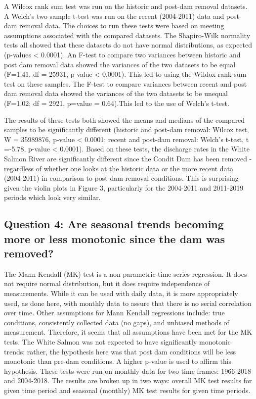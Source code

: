 \documentclass[
  12pt,
]{article}
\begin{document}
A Wilcox rank sum test was run on the historic and post-dam removal
datasets. A Welch's two sample t-test was run on the recent (2004-2011)
data and post-dam removal data. The choices to run these tests were
based on meeting assumptions associated with the compared datasets. The
Shapiro-Wilk normality tests all showed that these datasets do not have
normal distributions, as expected (p-values \textless{} 0.0001). An
F-test to compare two variances between historic and post dam removal
data showed the variances of the two datasets to be equal (F=1.41, df =
25931, p-value \textless{} 0.0001). This led to using the Wildox rank
sum test on these samples. The F-test to compare variances between
recent and post dam removal data showed the variances of the two
datasets to be unequal (F=1.02; df = 2921, p=value = 0.64).This led to
the use of Welch's t-test.

The results of these tests both showed the means and medians of the
compared samples to be significantly different (historic and post-dam
removal: Wilcox test, W = 35989876, p-value \textless{} 0.0001; recent
and post-dam removal: Welch's t-test, t =-5.78, p-value \textless{}
0.0001). Based on these tests, the discharge rates in the White Salmon
River are significantly different since the Condit Dam has been removed
- regardless of whether one looks at the historic data or the more
recent data (2004-2011) in comparison to post-dam removal conditions.
This is surprising given the violin plots in Figure 3, particularly for
the 2004-2011 and 2011-2019 periods which look very similar.

\hypertarget{question-4-are-seasonal-trends-becoming-more-or-less-monotonic-since-the-dam-was-removed}{%
\subsection{Question 4: Are seasonal trends becoming more or less
monotonic since the dam was
removed?}\label{question-4-are-seasonal-trends-becoming-more-or-less-monotonic-since-the-dam-was-removed}}

The Mann Kendall (MK) test is a non-parametric time series regression.
It does not require normal distribution, but it does require
independence of measurements. While it can be used with daily data, it
is more appropriately used, as done here, with monthly data to assure
that there is no serial correlation over time. Other assumptions for
Mann Kendall regressions include: true conditions, consistently
collected data (no gaps), and unbiased methods of measurement.
Therefore, it seems that all assumptions have been met for the MK tests.
The White Salmon was not expected to have significantly monotonic
trends; rather, the hypothesis here was that post dam conditions will be
less monotonic than pre-dam conditions. A higher p-value is used to
affirm this hypothesis. These tests were run on monthly data for two
time frames: 1966-2018 and 2004-2018. The results are broken up in two
ways: overall MK test results for given time period and seasonal
(monthly) MK test results for given time periods.
\end{document}
